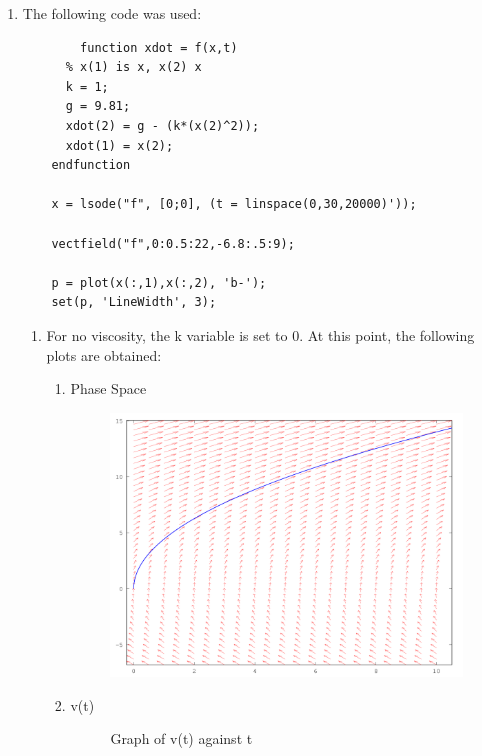 \documentclass{article}
\begin{document}
\begin{enumerate}
\begin{enumerate}[label*=\arabic*.]
\item The following code was used: 
	\begin{lstlisting}
	    function xdot = f(x,t)
      % x(1) is x, x(2) x
      k = 1;
      g = 9.81;
      xdot(2) = g - (k*(x(2)^2));
      xdot(1) = x(2);
    endfunction
    
    x = lsode("f", [0;0], (t = linspace(0,30,20000)'));
    
    vectfield("f",0:0.5:22,-6.8:.5:9);
    
    p = plot(x(:,1),x(:,2), 'b-');
    set(p, 'LineWidth', 3);
    \end{lstlisting}
    
    \begin{enumerate}[label=(\alph*)]
    	\item For no viscosity, the k variable is set to 0. At this point, the following plots are obtained:
	\begin{enumerate}[label=(\roman*)]	
		\item Phase Space \begin{figure}[H]
			\includegraphics[width=\textwidth]{a_NoDampening}
		\end{figure}
		\item v(t) \begin{figure}[H]
			\caption{Graph of v(t) against t}

\end{figure}
\end{enumerate}
\end{enumerate}
\end{enumerate}
\end{enumerate}
\end{document}

